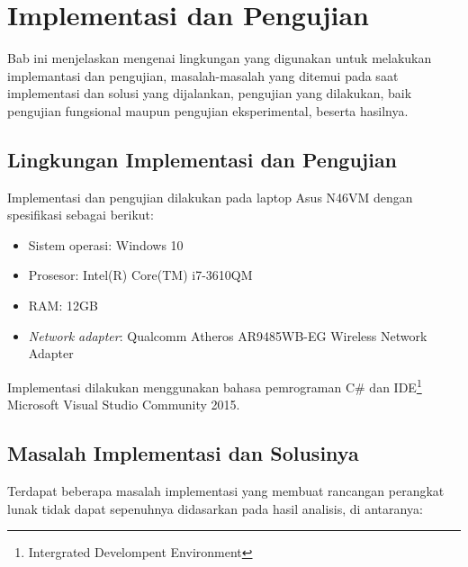 \chapter{Implementasi dan Pengujian}
\label{chap:implementasi_pengujian}

Bab ini menjelaskan mengenai lingkungan yang digunakan untuk melakukan implemantasi dan pengujian, masalah-masalah yang ditemui pada saat implementasi dan solusi yang dijalankan, pengujian yang dilakukan, baik pengujian fungsional maupun pengujian eksperimental, beserta hasilnya.

\section{Lingkungan Implementasi dan Pengujian}
\label{sec:lingkungan_implementasi_dan_pengujian}

Implementasi dan pengujian dilakukan pada laptop Asus N46VM dengan spesifikasi sebagai berikut:

\begin{itemize}
    \item{Sistem operasi: Windows 10}
    \item{Prosesor: Intel(R) Core(TM) i7-3610QM}
    \item{RAM: 12GB}
    \item{\textit{Network adapter}: Qualcomm Atheros AR9485WB-EG Wireless Network Adapter}
\end{itemize}

Implementasi dilakukan menggunakan bahasa pemrograman C\# dan IDE\footnote{Intergrated Develompent Environment} Microsoft Visual Studio Community 2015.

\section{Masalah Implementasi dan Solusinya}
\label{sec:masalah_implementasi}

Terdapat beberapa masalah implementasi yang membuat rancangan perangkat lunak tidak dapat sepenuhnya didasarkan pada hasil analisis, di antaranya:


